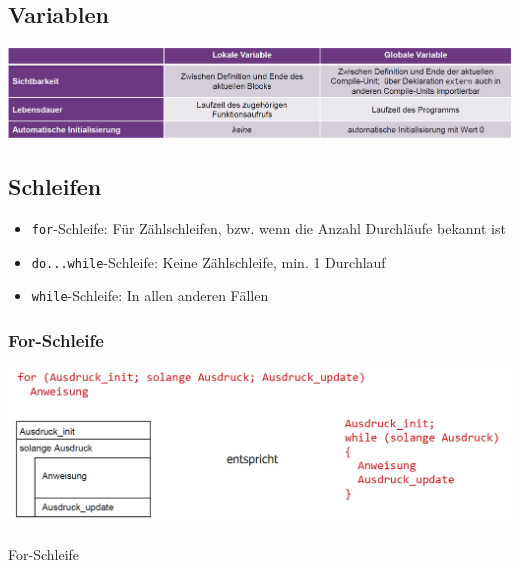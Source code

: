 	\subsection{Variablen}
		\begin{minipage}{1\linewidth}
			\includegraphics[width=1\linewidth]{Bilder/sichtbarkeit_variablen.png}
		\end{minipage}

	\subsection{Schleifen}
		\begin{itemize}
			\item \verb|for|-Schleife: Für Zählschleifen, bzw. wenn die Anzahl Durchläufe bekannt ist
			\item \verb|do...while|-Schleife: Keine Zählschleife, min. 1 Durchlauf
			\item \verb|while|-Schleife: In allen anderen Fällen	
		\end{itemize}

		\subsubsection{For-Schleife}
			\begin{minipage}{.45\linewidth}
				\includegraphics[width=0.95\linewidth]{Bilder/forschleife.png}
			\end{minipage}
			\hfill
			\begin{minipage}{.5\linewidth}
				For-Schleife
			\end{minipage}

